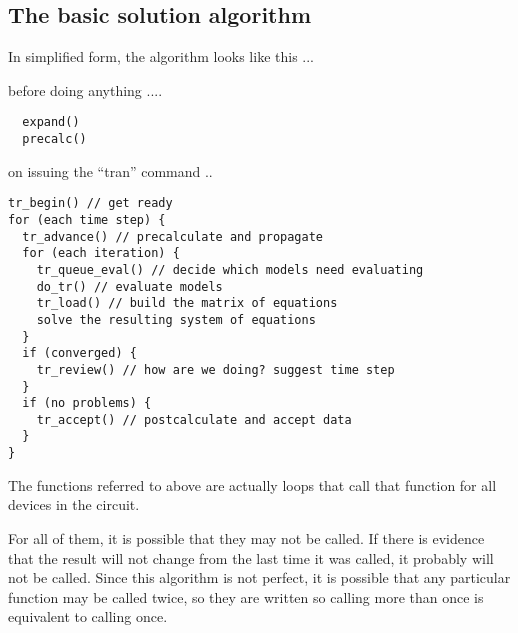 %
%
%
%
\subsection{The basic solution algorithm}

In simplified form, the algorithm looks like this ...

before doing anything ....
\begin{verbatim}
  expand()
  precalc()
\end{verbatim}

on issuing the ``tran'' command ..
\begin{verbatim}
tr_begin() // get ready
for (each time step) {
  tr_advance() // precalculate and propagate
  for (each iteration) {
    tr_queue_eval() // decide which models need evaluating
    do_tr() // evaluate models
    tr_load() // build the matrix of equations
    solve the resulting system of equations
  }
  if (converged) {
    tr_review() // how are we doing? suggest time step
  }
  if (no problems) {
    tr_accept() // postcalculate and accept data
  }
}
\end{verbatim}

The functions referred to above are actually loops that call that
function for all devices in the circuit.

For all of them, it is possible that they may not be called.  If there
is evidence that the result will not change from the last time it was
called, it probably will not be called.  Since this algorithm is not
perfect, it is possible that any particular function may be called
twice, so they are written so calling more than once is equivalent to
calling once.

